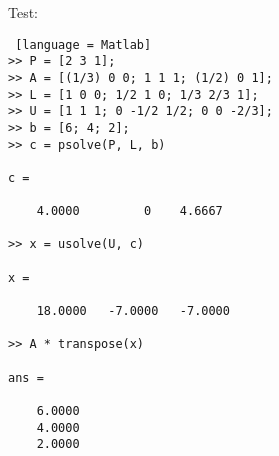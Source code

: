 \documentclass[12pt]{article}
\theoremstyle{homework}
\begin{document}
Test:
\begin{lstlisting} [language = Matlab]
>> P = [2 3 1];
>> A = [(1/3) 0 0; 1 1 1; (1/2) 0 1];
>> L = [1 0 0; 1/2 1 0; 1/3 2/3 1];
>> U = [1 1 1; 0 -1/2 1/2; 0 0 -2/3];
>> b = [6; 4; 2];
>> c = psolve(P, L, b)

c =

	4.0000         0    4.6667

>> x = usolve(U, c)

x =

	18.0000   -7.0000   -7.0000

>> A * transpose(x)

ans =

	6.0000
	4.0000
	2.0000
\end{lstlisting}
\end{document}
